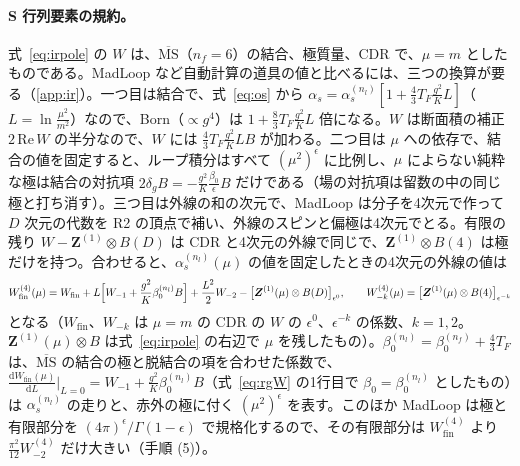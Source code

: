 \documentclass[a4paper,10pt]{ltjsarticle}
\newcommand{\dd}{\mathrm{d}}
\newcommand{\MSbar}{\overline{\mathrm{MS}}}
\begin{document}
\paragraph{S 行列要素の規約。}式~\eqref{eq:irpole} の $W$ は、$\MSbar$（$n_f=6$）の結合、極質量、CDR で、$\mu=m$ としたものである。MadLoop など自動計算の道具の値と比べるには、三つの換算が要る（\ref{app:ir}）。一つ目は結合で、式~\eqref{eq:os} から $\alpha_s=\alpha_s^{(n_l)}[1+\frac43T_F\frac{g^2}{K}L]$（$L=\ln\frac{\mu^2}{m^2}$）なので、Born（$\propto g^4$）は $1+\frac83T_F\frac{g^2}{K}L$ 倍になる。$W$ は断面積の補正 $2\,\mathrm{Re}\,W$ の半分なので、$W$ には $\frac43T_F\frac{g^2}{K}LB$ が加わる。二つ目は $\mu$ への依存で、結合の値を固定すると、ループ積分はすべて $(\mu^2)^\epsilon$ に比例し、$\mu$ によらない純粋な極は結合の対抗項 $2\delta_gB=-\frac{g^2}{K}\frac{\beta_0}{\epsilon}B$ だけである（場の対抗項は留数の中の同じ極と打ち消す）。三つ目は外線の和の次元で、MadLoop は分子を4次元で作って $D$ 次元の代数を R2 の頂点で補い、外線のスピンと偏極は4次元でとる。有限の残り $W-\boldsymbol Z^{(1)}\otimes B(D)$ は CDR と4次元の外線で同じで、$\boldsymbol Z^{(1)}\otimes B(4)$ は極だけを持つ。合わせると、$\alpha_s^{(n_l)}(\mu)$ の値を固定したときの4次元の外線の値は
\begin{equation}
\begin{gathered}
W^{(4)}_{\mathrm{fin}}(\mu)=W_{\mathrm{fin}}+L\Bigl[W_{-1}+\frac{g^2}{K}\beta_0^{(n_l)}B\Bigr]+\frac{L^2}{2}W_{-2}-\bigl[\boldsymbol Z^{(1)}(\mu)\otimes B(D)\bigr]_{\epsilon^0},\qquad
W^{(4)}_{-k}(\mu)=\bigl[\boldsymbol Z^{(1)}(\mu)\otimes B(4)\bigr]_{\epsilon^{-k}}
\end{gathered}
\label{eq:mlconv}
\end{equation}
となる（$W_{\mathrm{fin}}$、$W_{-k}$ は $\mu=m$ の CDR の $W$ の $\epsilon^0$、$\epsilon^{-k}$ の係数、$k=1,2$。$\boldsymbol Z^{(1)}(\mu)\otimes B$ は式~\eqref{eq:irpole} の右辺で $\mu$ を残したもの）。$\beta_0^{(n_l)}=\beta_0^{(n_f)}+\frac43T_F$ は、$\MSbar$ の結合の極と脱結合の項を合わせた係数で、$\frac{\dd W_{\mathrm{fin}}(\mu)}{\dd L}\big|_{L=0}=W_{-1}+\frac{g^2}{K}\beta_0^{(n_l)}B$（式~\eqref{eq:rgW} の1行目で $\beta_0=\beta_0^{(n_l)}$ としたもの）は $\alpha_s^{(n_l)}$ の走りと、赤外の極に付く $(\mu^2)^\epsilon$ を表す。このほか MadLoop は極と有限部分を $(4\pi)^\epsilon/\Gamma(1-\epsilon)$ で規格化するので、その有限部分は $W^{(4)}_{\mathrm{fin}}$ より $\frac{\pi^2}{12}W^{(4)}_{-2}$ だけ大きい（手順 (5)）。
\end{document}
